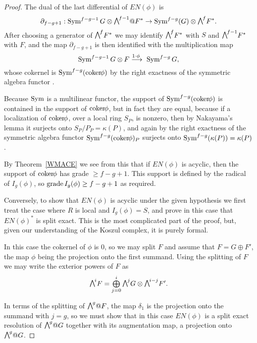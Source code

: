 \begin{proof}
The dual of the last differential of $EN(\phi)$ is
$$
\partial_{f-g+1}: \Sym^{f-g-1}G \otimes \mwedge^{f-1}@F^{*} \to
\Sym^{f-g}(G) \otimes \mwedge^{f}F^{*}.
$$
After choosing a generator of $\mwedge^{f}F^{*}$ we
may identify $\mwedge^{f}F^{*}$ with $S$ and $\mwedge^{f-1}F^{*}$ with $F$,
and the map $\partial_{f-g+1}$
is then identified with the multiplication map
$$
\Sym^{f-g-1}G \otimes F \ruto {\!1\cdot \phi} \Sym^{f-g}G
,
$$
whose cokernel is $\Sym^{f-g}(\coker \phi)$ by the right exactness of
the symmetric algebra functor \cite[Proposition A2.2]{Eisenbud1995}. 

Because $\operatorname{Sym}$ is a multilinear functor,
the
support of $\Sym^{f-g}(\coker \phi)$ is contained in the support
of $\coker \phi$, but in fact they are equal,
because
if a localization of
$\coker \phi$, over a local ring $S_{P}$,
is nonzero, then by
Nakayama's lemma
it surjects onto $S_{P}/P_{P} = \kappa(P)$, and again
%
by the right exactness
of the symmetric algebra functor $\Sym^{f-g}(\coker \phi)_{P}$ surjects
onto
$\operatorname{Sym}^{f-g}(\kappa(P)) = \kappa(P)$.

By Theorem~\ref{WMACE} we see from this that if $EN(\phi)$ is acyclic,
then the support of $\coker \phi$
has grade $\geq f-g+1$. This support is defined by the radical of
$I_{g}(\phi)$, so $\operatorname{grade} I_{g}(\phi)\geq f-g+1$ as required.

Conversely, to show that $EN(\phi)$ is acyclic under the given hypothesis
we first treat the case where $R$ is local and 
$I_{g}(\phi) = S$, and prove in this case that $EN(\phi)^{*}$ is split exact. This
is the most complicated part of the proof,
but, given our understanding of the Koszul complex, it is purely formal.

In this case the cokernel of $\phi$ is 0, so we may split $F$ and
assume that $F = G\oplus F'$, the map $\phi$ being the projection onto
the first summand. Using the splitting of $F$ we may write
the exterior powers of $F$ as  
$$
\mwedge^{i}F =\tsty\bigoplus\limits_{j=0}^{i}\mwedge^{j}G\otimes \mwedge^{i-j}F'.
$$

In terms of the splitting of $\mwedge^{g}@F$, the map $\delta_{1}$ 
is the projection onto the  summand with $j=g$, so we must show that
in this case
 $EN(\phi)$ is a split exact resolution of $\mwedge^{g}@G$ together with
 its augmentation map, a projection onto $\mwedge^{g}@G$.
 

\end{proof}
